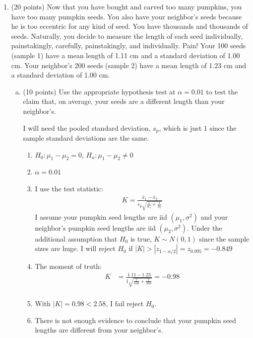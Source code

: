 \documentclass{article}\usepackage{graphicx, color}
\providecommand{\ov}[1]{\overline{#1}}
\numberwithin{equation}{section}
\begin{document}
\begin{flushleft}
\begin{enumerate}[1. ]
\item (20 points) Now that you have bought and carved too many pumpkins, you have too many pumpkin seeds. You also have your neighbor's seeds because he is too eccentric for any kind of seed. You have thousands and thousands of seeds. Naturally, you decide to measure the length of each seed individually, painstakingly, carefully, painstakingly, and individually. Pain! Your 100 seeds (sample 1) have a mean length of 1.11 cm and a standard deviation of 1.00 cm. Your neighbor's 200 seeds (sample 2) have a mean length of 1.23 cm and a standard deviation of 1.00 cm. 

\begin{enumerate}[a. ]
\item (10 points) Use the appropriate hypothesis test at $\alpha = 0.01$ to test the claim that, on average, your seeds are a different length than your neighbor's.

{\color{red}

I will need the pooled standard deviation, $s_p$, which is just $1$ since the sample standard deviations are the same.



\begin{enumerate}[1. ]
\item $H_0: \mu_1 - \mu_2 = 0$, $H_a: \mu_1 - \mu_2 \ne 0$
\item $\alpha = 0.01$
\item I use the test statistic:
\begin{align*}
K = \frac{\ov{x}_1 - \ov{x}_2}{s_p\sqrt{\frac{1}{n_1} + \frac{1}{n_2}}}
\end{align*}
I assume your pumpkin seed lengths are iid $(\mu_1, \sigma^2)$ and your neighbor's pumpkin seed lengths are iid $(\mu_2, \sigma^2)$. Under the additional assumption that $H_0$ is true, $K \sim N(0,1)$ since the sample sizes are huge. I will reject $H_0$ if $|K| > |z_{1 - \alpha/2}| = z_{ 0.995} = -0.849$
\item The moment of truth:
\begin{align*}
K &=\frac{1.11 - 1.23}{1\sqrt{\frac{1}{100} + \frac{1}{200}}}  = -0.98 \\
\end{align*} 
\item With $|K| = 0.98 < 2.58$, I fail reject $H_0$.
\item There is not enough evidence to conclude that your pumpkin seed lengths are different from your neighbor's.
\end{enumerate}



}
\end{enumerate}
\end{enumerate}
\end{flushleft}
\end{document}
